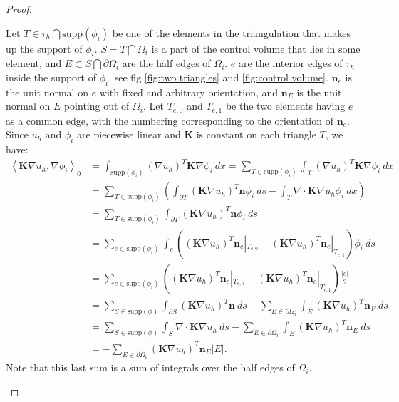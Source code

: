\documentclass[../Main/main.tex]{subfiles}
\begin{document}
\begin{proof}
\begin{enumerate}
			 Let $T \in \tau_h \bigcap \text{supp}(\phi_i)$ be one of the elements in the triangulation that makes up the support of $\phi_i$. $S=T\bigcap \Omega_i$ is a part of the control volume that lies in some element, and $E \subset S\bigcap \partial \Omega_i$ are the half edges of $\Omega_i$. $e$ are the interior edges of $\tau_h$ inside the support of $\phi_i$, see fig \ref{fig:two triangles} and \ref{fig:control volume}. $\bm{n}_e$ is the unit normal on $e$ with fixed and arbitrary orientation, and $\pmb{n}_E$ is the unit normal on $E$ pointing out of $\Omega_i$. Let $T_{e,0}$ and $T_{e,1}$ be the two elements having $e$ as a common edge, with the numbering corresponding to the orientation of $\bm{n}_e$. Since $u_h$ and $\phi_i$ are piecewise linear and $\bm{K}$ is constant on each triangle $T$, we have:
			\begin{equation}\label{eq:big computation}
				\begin{aligned}
					\left \langle\bm{K}\nabla u_h, \nabla \phi_i \right \rangle_0 &= \int_{\text{supp}(\phi_i)} (\nabla u_h)^T\bm{K}\nabla \phi_i \ dx = \sum_{T\in \text{supp}(\phi_i)} \int_T (\nabla u_h)^T\bm{K}\nabla \phi_i \ dx \\
					&= \sum_{T\in \text{supp}(\phi_i)} \left ( \int_{\partial T} (\pmb{K}\nabla u_h)^T\bm{n}\phi_i \ ds-\int_T \nabla \cdot\bm{K} \nabla u_h \phi_i \ dx \right ) \\
					&=\sum_{T\in \text{supp}(\phi_i)}\int_{\partial T} (\bm{K}\nabla u_h)^T\bm{n}\phi_i \ ds \\
					&= \sum_{e\in \text{supp}(\phi_i)} \int_e \left ((\bm{K}\nabla u_h)^T\bm{n}_e|_{T_{e,0}} - (\bm{K}\nabla u_h)^T\bm{n}_e|_{T_{e,1}} \right )\phi_i \ ds\\
					&= \sum_{e\in \text{supp}(\phi_i)}
					\left ((\bm{K}\nabla u_h)^T\bm{n}_e|_{T_{e,0}} - (\bm{K}\nabla u_h)^T\bm{n}_e|_{T_{e,1}} \right ) \frac{|e|}{2}\\
					&=\sum_{S\in \text{supp}(\phi)}\int_{\partial S}  (\bm{K}\nabla u_h)^T\bm{n} \ ds - \sum_{E\in \partial \Omega_i}\int_E (\bm{K}\nabla u_h)^T\bm{n}_E \ ds\\
					&= \sum_{S\in \text{supp}(\phi)}\int_{ S} \nabla \cdot\bm{K}\nabla u_h \ ds - \sum_{E\in \partial \Omega_i}\int_E (\pmb{K}\nabla u_h)^T\bm{n}_E \ ds\\
					&=- \sum_{E\in \partial \Omega_i} (\pmb{K}\nabla u_h)^T\bm{n}_E |E| .
				\end{aligned}
			\end{equation}
			Note that this last sum is a sum of integrals over the half edges of $\Omega_i$. 

\end{enumerate}
\end{proof}
\end{document}
